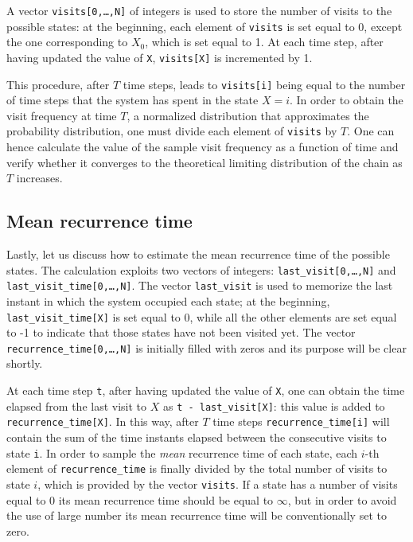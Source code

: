 A vector \texttt{visits[0,\dots,N]} of integers is used to store the number of visits to the possible states: at the beginning, each element of \texttt{visits} is set equal to 0, except the one corresponding to $X_0$, which is set equal to 1.  At each time step, after having updated the value of \texttt{X}, \texttt{visits[X]} is incremented by 1. 

This procedure, after $T$ time steps, leads to \texttt{visits[i]} being equal to the number of time steps that the system has spent in the state $X = i$. In order to obtain the visit frequency at time $T$, \ie a normalized distribution that approximates the probability distribution, one must divide each element of \texttt{visits} by $T$. One can hence calculate the value of the sample visit frequency as a function of time and verify whether it converges to the theoretical limiting distribution of the chain as $T$ increases.

\subsection{Mean recurrence time}
Lastly, let us discuss how to estimate the mean recurrence time of the possible states. The calculation exploits two vectors of integers: \texttt{last\_visit[0,\dots,N]} and \texttt{last\_visit\_time[0,\dots,N]}. The vector \texttt{last\_visit} is used to memorize the last instant in which the system occupied each state; at the beginning, \texttt{last\_visit\_time[X]} is set equal to 0, while all the other elements are set equal to -1 to indicate that those states have not been visited yet. The vector \texttt{recurrence\_time[0,\dots,N]} is initially filled with zeros and its purpose will be clear shortly.

At each time step \texttt{t}, after having updated the value of \texttt{X}, one can obtain the time elapsed from the last visit to $X$ as \texttt{t - last\_visit[X]}: this value is added to \texttt{recurrence\_time[X]}. In this way, after $T$ time steps \texttt{recurrence\_time[i]} will contain the sum of the time instants elapsed between the consecutive visits to state \texttt{i}. In order to sample the \emph{mean} recurrence time of each state, each $i$-th element of \texttt{recurrence\_time} is finally divided by the total number of visits to state $i$, which is provided by the vector \texttt{visits}. If a state has a number of visits equal to 0 its mean recurrence time should be equal to $\infty$, but in order to avoid the use of large number its mean recurrence time will be conventionally set to zero. 

